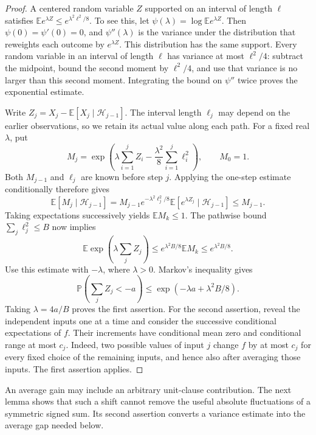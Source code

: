 \documentclass[11pt,a4paper]{article}
\theoremstyle{definition}
\theoremstyle{remark}
\newcommand{\E}{\mathbb E}
\newcommand{\Prb}{\mathbb P}
\begin{document}
\begin{proof}
A centered random variable $Z$ supported on an interval of length $\ell$
satisfies
$\E e^{\lambda Z}\le e^{\lambda^2\ell^2/8}$.
To see this, let $\psi(\lambda)=\log\E e^{\lambda Z}$.
Then $\psi(0)=\psi'(0)=0$, and $\psi''(\lambda)$ is the variance under
the distribution that reweights each outcome by $e^{\lambda Z}$.
This distribution has the same support. Every random variable in an
interval of length $\ell$ has variance at most $\ell^2/4$: subtract the
midpoint, bound the second moment by $\ell^2/4$, and use that variance
is no larger than this second moment. Integrating the bound on
$\psi''$ twice proves the exponential estimate.

Write $Z_j=X_j-\E[X_j\mid\mathcal H_{j-1}]$. The interval length
$\ell_j$ may depend on the earlier observations, so we retain its actual
value along each path. For a fixed real $\lambda$, put
\[
 M_j=\exp\left(\lambda\sum_{i=1}^j Z_i
                    -\frac{\lambda^2}{8}\sum_{i=1}^j\ell_i^2\right),
 \qquad M_0=1.
\]
Both $M_{j-1}$ and $\ell_j$ are known before step $j$. Applying the
one-step estimate conditionally therefore gives
\[
 \E[M_j\mid\mathcal H_{j-1}]
 =M_{j-1}e^{-\lambda^2\ell_j^2/8}
       \E[e^{\lambda Z_j}\mid\mathcal H_{j-1}]
 \le M_{j-1}.
\]
Taking expectations successively yields $\E M_k\le1$. The pathwise
bound $\sum_j\ell_j^2\le B$ now implies
\[
 \E\exp\left(\lambda\sum_jZ_j\right)
 \le e^{\lambda^2B/8}\E M_k\le e^{\lambda^2B/8}.
\]
Use this estimate with $-\lambda$, where $\lambda>0$. Markov's
inequality gives
\[
 \Prb\left(\sum_jZ_j<-a\right)
 \le \exp(-\lambda a+\lambda^2B/8).
\]
Taking $\lambda=4a/B$ proves the first assertion.
For the second assertion, reveal the independent
inputs one at a time and consider the successive conditional expectations
of $f$. Their increments have conditional mean zero and conditional
range at most $c_j$. Indeed, two possible values of input $j$ change
$f$ by at most $c_j$ for every fixed choice of the remaining inputs,
and hence also after averaging those inputs. The first assertion applies.
\end{proof}

An average gain may include an arbitrary unit-clause contribution.
The next lemma shows that such a shift cannot remove the useful absolute
fluctuations of a symmetric signed sum. Its second assertion converts a
variance estimate into the average gap needed below.
\end{document}
